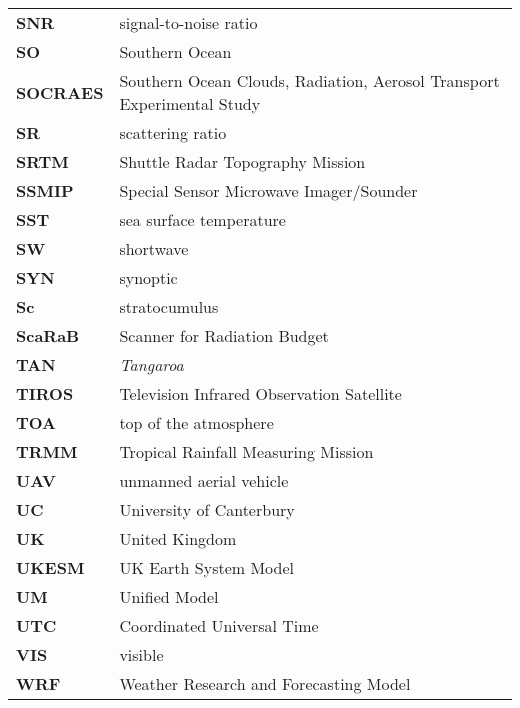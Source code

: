 \begin{longtable}{@{}p{2cm}p{20cm}}
\textbf{SNR} & signal-to-noise ratio\\
\textbf{SO} & Southern Ocean\\
\textbf{SOCRAES} & Southern Ocean Clouds, Radiation, Aerosol Transport
Experimental Study\\
\textbf{SR} & scattering ratio\\
\textbf{SRTM} & Shuttle Radar Topography Mission\\
\textbf{SSMIP} & Special Sensor Microwave Imager/Sounder\\
\textbf{SST} & sea surface temperature\\
\textbf{SW} & shortwave\\
\textbf{SYN} & synoptic\\
\textbf{Sc} & stratocumulus\\
\textbf{ScaRaB} & Scanner for Radiation Budget\\
\textbf{TAN} & \textit{Tangaroa}\\
\textbf{TIROS} & Television Infrared Observation Satellite\\
\textbf{TOA} & top of the atmosphere\\
\textbf{TRMM} & Tropical Rainfall Measuring Mission\\
\textbf{UAV} & unmanned aerial vehicle\\
\textbf{UC} & University of Canterbury\\
\textbf{UK} & United Kingdom\\
\textbf{UKESM} & UK Earth System Model\\
\textbf{UM} & Unified Model\\
\textbf{UTC} & Coordinated Universal Time\\
\textbf{VIS} & visible\\
\textbf{WRF} & Weather Research and Forecasting Model\\
\end{longtable}
